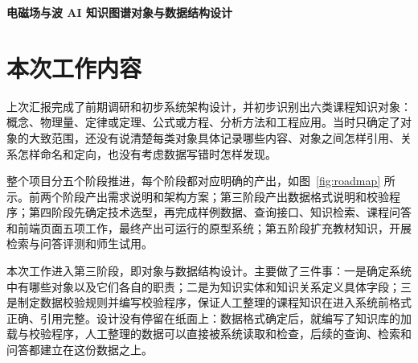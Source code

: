 \documentclass[UTF8,a4paper,zihao=-4]{ctexart}
\begin{document}
\begin{center}
{\LARGE\bfseries 电磁场与波 AI 知识图谱对象与数据结构设计}
\end{center}
\vspace{0.5em}

\section{本次工作内容}

上次汇报完成了前期调研和初步系统架构设计，并初步识别出六类课程知识对象：概念、物理量、定律或定理、公式或方程、分析方法和工程应用。当时只确定了对象的大致范围，还没有说清楚每类对象具体记录哪些内容、对象之间怎样引用、关系怎样命名和定向，也没有考虑数据写错时怎样发现。

整个项目分五个阶段推进，每个阶段都对应明确的产出，如图~\ref{fig:roadmap} 所示。前两个阶段产出需求说明和架构方案；第三阶段产出数据格式说明和校验程序；第四阶段先确定技术选型，再完成样例数据、查询接口、知识检索、课程问答和前端页面五项工作，最终产出可运行的原型系统；第五阶段扩充教材知识，开展检索与问答评测和师生试用。

本次工作进入第三阶段，即对象与数据结构设计。主要做了三件事：一是确定系统中有哪些对象以及它们各自的职责；二是为知识实体和知识关系定义具体字段；三是制定数据校验规则并编写校验程序，保证人工整理的课程知识在进入系统前格式正确、引用完整。设计没有停留在纸面上：数据格式确定后，就编写了知识库的加载与校验程序，人工整理的数据可以直接被系统读取和检查，后续的查询、检索和问答都建立在这份数据之上。
\end{document}

